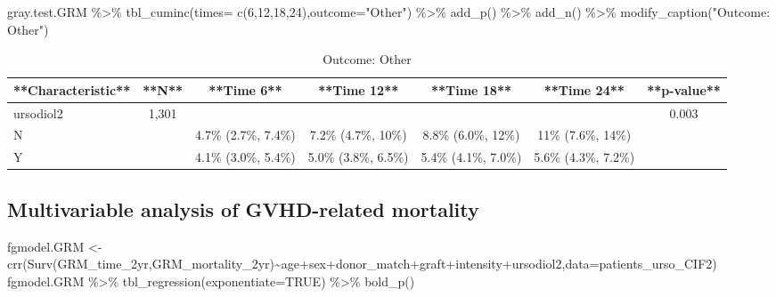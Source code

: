 \documentclass[
]{book}
\newenvironment{Shaded}{\begin{snugshade}}{\end{snugshade}}
\newcommand{\AttributeTok}[1]{\textcolor[rgb]{0.77,0.63,0.00}{#1}}
\newcommand{\ConstantTok}[1]{\textcolor[rgb]{0.00,0.00,0.00}{#1}}
\newcommand{\DecValTok}[1]{\textcolor[rgb]{0.00,0.00,0.81}{#1}}
\newcommand{\FunctionTok}[1]{\textcolor[rgb]{0.00,0.00,0.00}{#1}}
\newcommand{\NormalTok}[1]{#1}
\newcommand{\OtherTok}[1]{\textcolor[rgb]{0.56,0.35,0.01}{#1}}
\newcommand{\SpecialCharTok}[1]{\textcolor[rgb]{0.00,0.00,0.00}{#1}}
\newcommand{\StringTok}[1]{\textcolor[rgb]{0.31,0.60,0.02}{#1}}
\begin{document}
\begin{Shaded}
\begin{Highlighting}[]
\NormalTok{gray.test.GRM }\SpecialCharTok{\%\textgreater{}\%} \FunctionTok{tbl\_cuminc}\NormalTok{(}\AttributeTok{times=} \FunctionTok{c}\NormalTok{(}\DecValTok{6}\NormalTok{,}\DecValTok{12}\NormalTok{,}\DecValTok{18}\NormalTok{,}\DecValTok{24}\NormalTok{),}\AttributeTok{outcome=}\StringTok{"Other"}\NormalTok{) }\SpecialCharTok{\%\textgreater{}\%} 
  \FunctionTok{add\_p}\NormalTok{() }\SpecialCharTok{\%\textgreater{}\%} 
  \FunctionTok{add\_n}\NormalTok{() }\SpecialCharTok{\%\textgreater{}\%} 
  \FunctionTok{modify\_caption}\NormalTok{(}\StringTok{"Outcome: Other"}\NormalTok{)}
\end{Highlighting}
\end{Shaded}

\begin{table}

\caption{\label{tab:unnamed-chunk-46}Outcome: Other}
\centering
\begin{tabular}[t]{l|c|c|c|c|c|c}
\hline
**Characteristic** & **N** & **Time 6** & **Time 12** & **Time 18** & **Time 24** & **p-value**\\
\hline
ursodiol2 & 1,301 &  &  &  &  & 0.003\\
\hline
N &  & 4.7\% (2.7\%, 7.4\%) & 7.2\% (4.7\%, 10\%) & 8.8\% (6.0\%, 12\%) & 11\% (7.6\%, 14\%) & \\
\hline
Y &  & 4.1\% (3.0\%, 5.4\%) & 5.0\% (3.8\%, 6.5\%) & 5.4\% (4.1\%, 7.0\%) & 5.6\% (4.3\%, 7.2\%) & \\
\hline
\end{tabular}
\end{table}

\hypertarget{multivariable-analysis-of-gvhd-related-mortality}{%
\subsection{Multivariable analysis of GVHD-related mortality}\label{multivariable-analysis-of-gvhd-related-mortality}}

\begin{Shaded}
\begin{Highlighting}[]
\NormalTok{fgmodel.GRM }\OtherTok{\textless{}{-}} \FunctionTok{crr}\NormalTok{(}\FunctionTok{Surv}\NormalTok{(GRM\_time\_2yr,GRM\_mortality\_2yr)}\SpecialCharTok{\textasciitilde{}}\NormalTok{age}\SpecialCharTok{+}\NormalTok{sex}\SpecialCharTok{+}\NormalTok{donor\_match}\SpecialCharTok{+}\NormalTok{graft}\SpecialCharTok{+}\NormalTok{intensity}\SpecialCharTok{+}\NormalTok{ursodiol2,}\AttributeTok{data=}\NormalTok{patients\_urso\_CIF2)}
\NormalTok{fgmodel.GRM }\SpecialCharTok{\%\textgreater{}\%} \FunctionTok{tbl\_regression}\NormalTok{(}\AttributeTok{exponentiate=}\ConstantTok{TRUE}\NormalTok{) }\SpecialCharTok{\%\textgreater{}\%} \FunctionTok{bold\_p}\NormalTok{()}
\end{Highlighting}
\end{Shaded}
\end{document}
